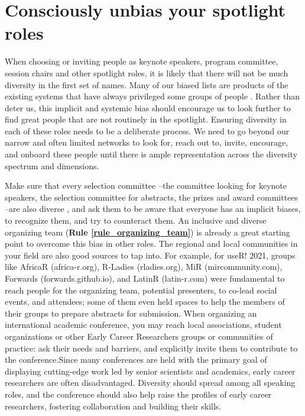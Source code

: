 \documentclass[10pt,letterpaper]{article}
\begin{document}
\section{Consciously unbias your spotlight roles}
\label{rule_spotlight}

When choosing or inviting people as keynote speakers, program committee, session chairs and other spotlight roles, it is likely that there will not be much diversity in the first set of names. Many of our biased lists are products of the existing systems that have always privileged some groups of people \cite{dwyerNoticeWhoScience2021,swartzScienceValueDiversity2019,wongBuildDiversityScience2020,dignazioUnicornsJanitorsNinjas2020}. Rather than deter us, this implicit and systemic bias should encourage us to look further to find great people that are not routinely in the spotlight. 
Ensuring diversity in each of these roles needs to be a deliberate process. We need to go beyond our narrow and often limited networks to look for, reach out to, invite, encourage, and onboard these people until there is ample representation across the diversity spectrum and dimensions. 

Make sure that every selection committee --the committee looking for keynote speakers, the selection committee for abstracts, the prizes and award committees --are also diverse \cite{swartzScienceValueDiversity2019, wongBuildDiversityScience2020}, and ask them to be aware that everyone has an implicit biases, to recognize them, and try to counteract them.  An inclusive and diverse organizing team (\textbf{Rule \ref{rule_organizing_team}}) is already a great starting point to overcome this bias in other roles. The regional and local communities in your field are also good sources to tap into. 
For example, for useR! 2021, groups like AfricaR (africa-r.org), R-Ladies (rladies.org), MiR (mircommunity.com), Forwards (forwards.github.io), and LatinR (latin-r.com) were fundamental to reach people for the organizing team, potential presenters, to co-lead social events, and attendees; some of them even held spaces to help the members of their groups to prepare abstracts for submission.
When organizing an international academic conference, you may reach local associations, student organizations or other Early Career Researchers groups or communities of practice: ask their needs and barriers, and explicitly invite them to contribute to the conference.Since many conferences are held with the primary goal of displaying cutting-edge work led by senior scientists and academics, early career researchers are often disadvantaged. Diversity should spread among all speaking roles, and the conference should also help raise the profiles of early career researchers, fostering collaboration and building their skills.
\end{document}
